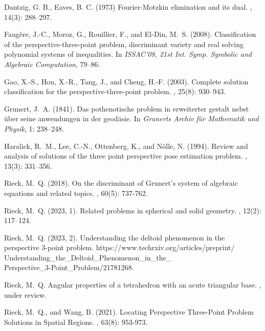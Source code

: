 \documentclass[a4paper, twoside]{article}
\begin{document}

{\small

\begin{thebibliography}{}

Dantzig, G. B., Eaves, B. C. (1973)
\newblock Fourier-Motzkin elimination and its dual.
, 14(3): 288--297. 

Faug\`ere, J.-C., Moroz, G., Rouillier, F., and El-Din, M.~S. (2008).
\newblock Classification of the perspective-three-point problem, discriminant variety and real solving polynomial systems of inequalities.
\newblock In {\em ISSAC'08, 21st Int. Symp. Symbolic and Algebraic Computation}, 79--86.

Gao, X.-S., Hou, X.-R., Tang, J., and Cheng, H.-F. (2003).
\newblock Complete solution classification for the perspective-three-point problem.
, 25(8): 930--943.

Grunert, J.~A. (1841).
\newblock Das pothenotische problem in erweiterter gestalt nebst {\"u}ber seine anwendungen in der geod{\"a}sie.
\newblock In {\em Grunerts Archiv f{\"u}r Mathematik und Physik}, 1: 238--248.

Haralick, R.~M., Lee, C.-N., Ottenberg, K., and N{\"o}lle, N. (1994).
\newblock Review and analysis of solutions of the three point perspective pose estimation problem.
, 13(3): 331--356.

Rieck, M.~Q. (2018).
\newblock On the discriminant of Grunert's system of algebraic equations and related topics.
, 60(5):  737-762.

Rieck, M.~Q. (2023, 1).
\newblock Related problems in spherical and solid geometry.  
, 12(2): 117--124. 

Rieck, M.~Q. (2023, 2).
\newblock Understanding the deltoid phenomenon in the perspective 3-point problem.  
 https://www.techrxiv.org/articles/preprint/\\Understanding\_the\_Deltoid\_Phenomenon\_in\_the\_\\Perspective\_3-Point\_Problem/21781268.

Rieck, M.~Q.
\newblock Angular properties of a tetrahedron with an acute triangular base.
, under review.

Rieck, M.~Q., and Wang, B. (2021). 
\newblock Locating Perspective Three-Point Problem Solutions in Spatial Regions.
, 63(8): 953-973.

\end{thebibliography} }
\end{document}
